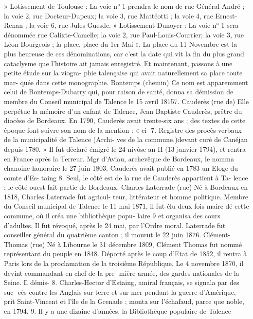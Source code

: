 \documentclass[a4paper,11pt]{book}
\begin{document}
» Lotissement de Toulouse : La voie n° 1 prendra le nom
de rue Général-André ; la voie 2, rue Docteur-Dupeux; la
voie 3, rue Mattéotti ; la voie 4, rue Ernest-Renan ; la voie
6, rue Jules-Guesde.
» Lotissement Dunoyer : La voie n° 1 sera dénommée
rue Calixte-Camelle; la voie 2, rue Paul-Louis-Courrier;
la voie 3, rue Léon-Bourgeois ; la place, place du 1er-Mai ».
La place du 11-Novembre est la plus heureuse de ces
dénominations, car c'est la date qui vit la fin du plus grand
cataclysme que l'histoire ait jamais enregistré.
Et maintenant, passons à une petite étude sur la viogra-
phie talençaise qui avait naturellement sa place toute mar-
quée dans cette monographie.
Bontemps (chemin)
Ce nom est apparemment celui de Bontemps-Dubarry
qui, pour raison de santé, donna sa démission de membre
du Conseil municipal de Talence le 15 avril 18157.
Cauderès (rue de)
Elle perpétue la mémoire d'un enfant de Talence, Jean
Baptiste Cauderès, prêtre du diocèse de Bordeaux.
En 1790, Cauderès avait trente-six ans ; des textes de
cette époque font suivre son nom de la mention : « ci-
7. Registre des procès-verbaux de la municipalité de Talence (Archi-
ves de la commune.)devant curé de Canéjan depuis 1780. » Il fut déclaré émigré
le 24 nivôse an II (13 janvier 1794), et rentra en France
après la Terreur. Mgr d'Aviau, archevêque de Bordeaux,
le nomma chanoine honoraire le 27 juin 1803.
Cauderès avait publié en 1783 un Eloge du comte d'Es-
taing 8.
Seul, le côté est de la rue de Cauderès appartient à Ta-
lence ; le côté ouest fait partie de Bordeaux.
Charles-Laterrade (rue)
Né à Bordeaux en 1818, Charles Laterrade fut agricul-
teur, littérateur et homme politique. Membre du Conseil
municipal de Talence le 11 mai 1871, il fut élu deux fois
maire dé cette commune, où il créa une bibliothèque popu-
laire 9 et organisa des cours d'adultes. Il fut révoqué, après
le 24 mai, par l'Ordre moral.
Laterrade fut conseiller général du quatrième canton ;
il mourut le 22 juin
1876.
Clément-Thomas (rue)
Né à Libourne le 31 décembre 1809, Clément Thomas fut
nommé représentant du peuple en 1848.
Déporté après le coup d'Etat de 1852, il rentra à Paris
lors de la proclamation de la troisième République. Le
4 novembre 1870, il devint commandant en chef de la pre-
mière armée, des gardes nationales de la Seine. Il démis-
8. Charles-Hector d'Estaing, amiral français, se signala par des suc-
cès contre les Anglais sur terre et sur mer pendant la guerre d'Amérique,
prit Saint-Vincent et l'île de la Grenade ; monta sur l'échafaud, parce que
noble, en 1794.
9. Il y a une dizaine d'années, la Bibliothèque populaire de Talence
\end{document}
